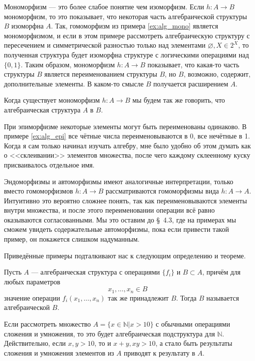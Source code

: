 Мономорфизм --- это более слабое понятие чем изоморфизм. Если $h:A\to B$ мономорфизм, то это показывает, что некоторая часть алгебраической структуры $B$ изоморфна $A$. Так, гомоморфизм из примера \ref{ex:alg_mono} является мономорфизмом, и если в этом примере рассмотреть алгебраическую структуру с пересечением и симметрической разностью только над элементами $\varnothing, X \in 2^X$, то полученная структура будет изоморфна структуре с логическими операциями над $\{0, 1\}$. Таким образом, мономорфизм $h:A\to B$ показывает, что какая-то часть структуры $B$ является переименованием структуры $B$, но $B$, возможно, содержит, дополнительные элементы. В каком-то смысле $B$ получается расширением $A$.

Когда существует мономорфизм $h:A\to B$ мы будем так же говорить, что алгебраическая структура $A$  в $B$.

При эпиморфизме некоторые элементы могут быть переименованы одинаково. В примере \ref{ex:alg_epi} все чётные числа переименовываются в 0, все нечётные в 1. Когда я сам только начинал изучать алгебру, мне было удобно об этом думать как о <<склеивании>> элементов множества, после чего каждому склеенному куску присваивалось отдельное имя.

Эндоморфизмы и автоморфизмы имеют аналогичные интерпретации, только вместо гомоморфизмов $h:A\to B$ рассматриваются гомоморфизмы вида $h:A\to A$. Интуитивно это вероятно сложнее понять, так как переименовываются элементы внутри множества, и после этого переименовании операции всё равно оказываются согласованными. Мы это оставим до \S~4.3, где на примерах мы сможем увидеть содержательные автоморфизмы, пока если привести такой пример, он покажется слишком надуманным.

Приведённые примеры подталкивают нас к следующим определению и теореме.

\begin{definition}
	Пусть $A$ --- алгебраическая структура с операциями $\{f_i\}$ и $B\subset A$, причём для любых параметров $$x_1,\ldots,x_n \in B$$ значение операции $f_i(x_1,\ldots,x_n)$ так же принадлежит $B$. Тогда $B$ называется алгебраической  $B$.
\end{definition}

\begin{example}
	Если рассмотреть множество $A = \{x\in \mathbb{N}|x>10\}$ с обычными операциями сложения и умножения, то это будет алгебраическая подструктура для $\mathbb{N}$. Действительно, если ${x,y>10}$, то и $x+y, xy>10$, а стало быть результаты сложения и умножения элементов из $A$ приводят к результату в $A$.
\end{example}

